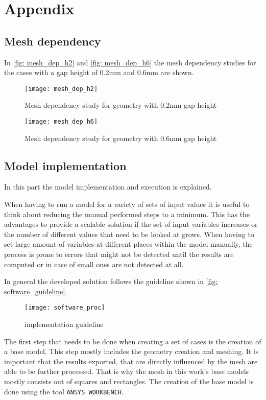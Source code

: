 \documentclass[../thesis.tex]{subfiles}
\begin{document}
\chapter{Appendix}


\section{Mesh dependency}

In \autoref{fig: mesh_dep_h2} and \autoref{fig: mesh_dep_h6} the mesh dependency studies for the cases with a gap height of 0.2mm and 0.6mm are shown.
\begin{figure}[htb]
	\centering
	\texttt{[image: mesh\_dep\_h2]}
	\caption{Mesh dependency study for geometry with 0.2mm gap height}
	\label{fig: mesh_dep_h2}
\end{figure}

\begin{figure}[htb]
	\centering
	\texttt{[image: mesh\_dep\_h6]}
	\caption{Mesh dependency study for geometry with 0.6mm gap height}
	\label{fig: mesh_dep_h6}
\end{figure}

\section{Model implementation}

In this part the model implementation and execution is explained.

When having to run a model for a variety of sets of input values it is useful to think about reducing the manual performed steps to a minimum. This has the advantages to provide a scalable solution if the set of input variables increases or the number of different values that need to be looked at grows. When having to set large amount of variables at different places within the model manually, the process is prone to errors that might not be detected until the results are computed or in case of small ones are not detected at all.

In general the developed solution follows the guideline shown in \autoref{fig: software_guideline}.

\begin{figure}[htbp]
	\centering
	\texttt{[image: software\_proc]}
	\caption{implementation guideline}
	\label{fig: software_guideline}
\end{figure}

The first step that needs to be done when creating a set of cases is the creation of a base model. This step mostly includes the geometry creation and meshing. It is important that the results exported, that are directly influenced by the mesh are able to be further processed. That is why the mesh in this work's base models mostly consists out of squares and rectangles. The creation of the base model is done using the tool \texttt{ANSYS WORKBENCH}.
\end{document}
